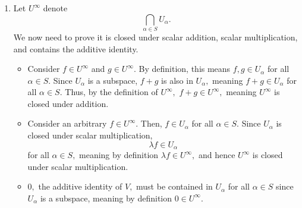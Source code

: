 \documentclass[12pt]{article}
\begin{document}
\begin{enumerate}
\begin{itemize}
      \item Since
        \begin{align*}
          (\mu (f + g) )(x) &= \mu (f+g)(x) \\
          &= \mu (f(x) + g(x)) \\
          &= \mu f(x) + \mu g(x) \\
          &= (\mu f)(x) + (\mu g)(x) \\
          &= (\mu f+ \mu g)(x),
        \end{align*}
        we know $\mu(f + g) = \mu f + \mu g,$ meaning scalar
        multiplication distributes under addition on $V^{S}$.

      \item Finally, we know
        \begin{align*}
          ((\lambda + \mu)f)(x) = (\lambda + \mu)f(x) &= \lambda f(x)
          + \mu f(x) \\
          &= (\lambda f + \mu f)(x),
        \end{align*}
        we can conclude that $(\lambda + \mu)f = \lambda f + \mu f.$
    \end{itemize}

    Since $V^{S}$ satisfies the axioms of a vector space, it is a vector space.

  \item Let $U^{\infty}$ denote $$\bigcap_{\alpha \in S}
    U_{\alpha}.$$ We now need to prove it is closed under scalar
    addition, scalar multiplication, and contains the additive identity.

    \begin{itemize}
      \item Consider $f \in U^{\infty}$ and $g \in U^{\infty}.$ By
        definition, this means $f, g \in U_{\alpha}$ for all $\alpha
        \in S.$ Since $U_{\alpha}$ is a subspace, $f + g$ is also in
        $U_{\alpha},$ meaning $f + g \in U_{\alpha}$ for all $\alpha
        \in S.$ Thus, by the definition of $U^{\infty},$ $f + g \in
        U^{\infty},$ meaning $U^{\infty}$ is closed under addition.
      \item Consider an arbitrary $f \in U^{\infty}.$ Then, $f \in
        U_{\alpha}$ for all $\alpha \in S.$ Since $U_\alpha$ is
        closed under scalar multiplication, $$\lambda f \in
        U_\alpha$$ for all $\alpha \in S,$ meaning by definition
        $\lambda f \in U^{\infty},$ and hence $U^{\infty}$ is closed
        under scalar multiplication.

      \item $0,$ the additive identity of $V,$ must be contained in
        $U_\alpha$ for all $\alpha \in S$ since $U_\alpha$ is a
        subspace, meaning by definition $0 \in U^{\infty}.$


\end{itemize}
\end{enumerate}
\end{document}
